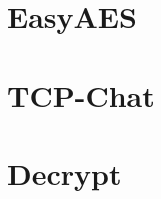 \documentclass[a4paper,12bpt]{scrartcl}
\begin{document}
\section{EasyAES}
\label{sec:EasyAES}



\begin{appendices}
    \section{TCP-Chat}
    \label{sec:TCP-Chat}
    
    
    

    \section{Decrypt}
    \label{sec:Decrypt}
    
    
\end{appendices}
\end{document}
